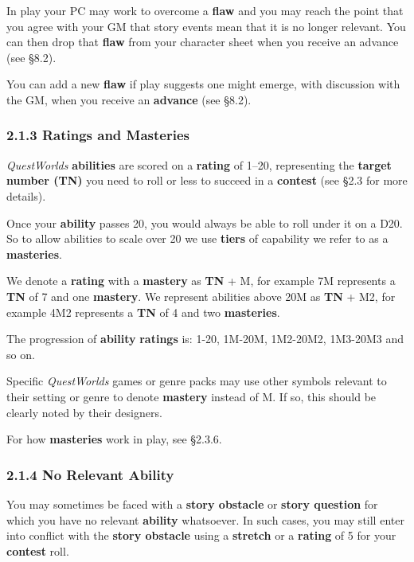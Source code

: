 \documentclass[
  11pt,
]{article}
\begin{document}
In play your PC may work to overcome a \textbf{flaw} and you may reach
the point that you agree with your GM that story events mean that it is
no longer relevant. You can then drop that \textbf{flaw} from your
character sheet when you receive an advance (see §8.2).

You can add a new \textbf{flaw} if play suggests one might emerge, with
discussion with the GM, when you receive an \textbf{advance} (see §8.2).

\hypertarget{ratings-and-masteries}{%
\subsubsection{2.1.3 Ratings and
Masteries}\label{ratings-and-masteries}}

\emph{QuestWorlds} \textbf{abilities} are scored on a \textbf{rating} of
1--20, representing the \textbf{target number (TN)} you need to roll or
less to succeed in a \textbf{contest} (see §2.3 for more details).

Once your \textbf{ability} passes 20, you would always be able to roll
under it on a D20. So to allow abilities to scale over 20 we use
\textbf{tiers} of capability we refer to as a \textbf{masteries}.

We denote a \textbf{rating} with a \textbf{mastery} as \textbf{TN} + M,
for example 7M represents a \textbf{TN} of 7 and one \textbf{mastery}.
We represent abilities above 20M as \textbf{TN} + M2, for example 4M2
represents a \textbf{TN} of 4 and two \textbf{masteries}.

The progression of \textbf{ability} \textbf{ratings} is: 1-20, 1M-20M,
1M2-20M2, 1M3-20M3 and so on.

Specific \emph{QuestWorlds} games or genre packs may use other symbols
relevant to their setting or genre to denote \textbf{mastery} instead of
M. If so, this should be clearly noted by their designers.

For how \textbf{masteries} work in play, see §2.3.6.

\hypertarget{no-relevant-ability}{%
\subsubsection{\texorpdfstring{2.1.4 No Relevant
\textbf{Ability}}{2.1.4 No Relevant Ability}}\label{no-relevant-ability}}

You may sometimes be faced with a \textbf{story obstacle} or
\textbf{story question} for which you have no relevant \textbf{ability}
whatsoever. In such cases, you may still enter into conflict with the
\textbf{story obstacle} using a \textbf{stretch} or a \textbf{rating} of
5 for your \textbf{contest} roll.
\end{document}

